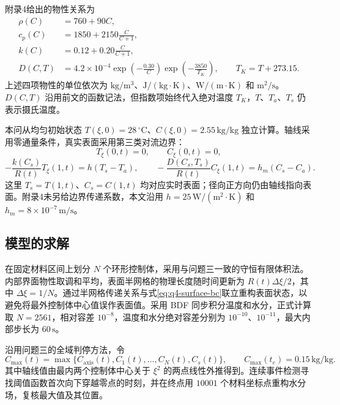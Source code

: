 附录4给出的物性关系为
\begin{equation}
\begin{aligned}
\rho(C)&=760+90C,\\
c_p(C)&=1850+2150\frac{C}{C+1},\\
k(C)&=0.12+0.20\frac{C}{C+1},\\
D(C,T)&=4.2\times10^{-4}\exp\!\left(-\frac{0.30}{C}\right)
\exp\!\left(-\frac{3850}{T_K}\right),\qquad T_K=T+273.15.
\end{aligned}
\label{eq:q4-properties}
\end{equation}
上述四项物性的单位依次为 $\mathrm{kg/m^3}$、$\mathrm{J/(kg\cdot K)}$、$\mathrm{W/(m\cdot K)}$ 和 $\mathrm{m^2/s}$。$D(C,T)$ 沿用前文的函数记法，但指数项始终代入绝对温度 $T_K$，$T$、$T_a$、$T_s$ 仍表示摄氏温度。

本问从均匀初始状态 $T(\xi,0)=28\,{}^\circ\mathrm{C}$、$C(\xi,0)=2.55\,\mathrm{kg/kg}$ 独立计算。轴线采用零通量条件，真实表面采用第三类对流边界：
\begin{equation}
T_\xi(0,t)=0,\qquad C_\xi(0,t)=0,
\label{eq:q4-axis-bc}
\end{equation}
\begin{equation}
-\frac{k(C_s)}{R(t)}T_\xi(1,t)=h(T_s-T_a),\qquad
-\frac{D(C_s,T_s)}{R(t)}C_\xi(1,t)=h_m(C_s-C_a).
\label{eq:q4-surface-bc}
\end{equation}
这里 $T_s=T(1,t)$、$C_s=C(1,t)$ 均对应实时表面；径向正方向仍由轴线指向表面。附录4未另给边界传递系数，本文沿用 $h=25\,\mathrm{W/(m^2\cdot K)}$ 和 $h_m=8\times10^{-7}\,\mathrm{m/s}$。

\subsection{模型的求解}

在固定材料区间上划分 $N$ 个环形控制体，采用与问题三一致的守恒有限体积法。内部界面物性取调和平均，表面半网格的物理长度随时间更新为 $R(t)\Delta\xi/2$，其中 $\Delta\xi=1/N$。通过半网格传递关系与式\eqref{eq:q4-surface-bc}联立重构表面状态，以避免将最外控制体中心值误作表面值。采用 BDF 同步积分温度和水分，正式计算取 $N=2561$，相对容差 $10^{-8}$，温度和水分绝对容差分别为 $10^{-10}$、$10^{-11}$，最大内部步长为 $60\,\mathrm{s}$。

沿用问题三的全域判停方法，令
\begin{equation}
C_{\max}(t)=\max\{C_{\mathrm{axis}}(t),C_1(t),\ldots,C_N(t),C_s(t)\},
\qquad C_{\max}(t_e)=0.15\,\mathrm{kg/kg}.
\label{eq:q4-event}
\end{equation}
其中轴线值由最内两个控制体中心关于 $\xi^2$ 的两点线性外推得到。连续事件检测寻找阈值函数首次向下穿越零点的时刻，并在终点用 $10001$ 个材料坐标点重构水分场，复核最大值及其位置。

